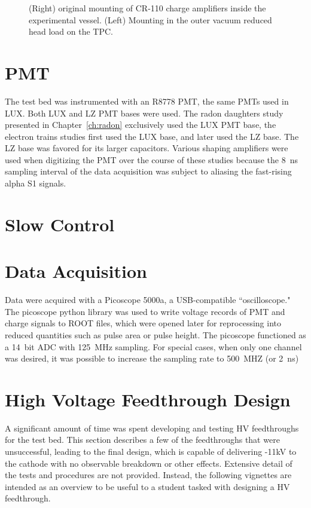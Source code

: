 \begin{figure}[htbp]
\begin{center}
\caption{(Right) original mounting of CR-110 charge amplifiers inside the experimental vessel. (Left) Mounting in the outer vacuum reduced head load on the TPC.}
\label{fig:chargeamp_mount}
\end{center}
\end{figure}



\section{PMT}
The test bed was instrumented with an R8778 PMT, the same PMTs used in LUX. Both LUX and LZ PMT bases were used. The radon daughters study presented in Chapter~\ref{ch:radon} exclusively used the LUX PMT base, the electron trains studies first used the LUX base, and later used the LZ base. The LZ base was favored for its larger capacitors. Various shaping amplifiers were used when digitizing the PMT over the course of these studies because the 8~ns sampling interval of the data acquisition was subject to aliasing the fast-rising alpha S1 signals.


\section{Slow Control}

\section{Data Acquisition}
Data were acquired with a Picoscope 5000a, a USB-compatible ``oscilloscope." The picoscope python library was used to write voltage records of PMT and charge signals to ROOT files, which were opened later for reprocessing into reduced quantities such as pulse area or pulse height. The picoscope functioned as a 14~bit ADC with 125~MHz sampling. For special cases, when only one channel was desired, it was possible to increase the sampling rate to 500~MHZ (or 2~ns)



\section{High Voltage Feedthrough Design}
A significant amount of time was spent developing and testing \ac{HV} feedthroughs for the test bed. This section describes a few of the feedthroughs that were unsuccessful, leading to the final design, which is capable of delivering -11kV to the cathode with no observable breakdown or other effects. Extensive detail of the tests and procedures are not provided. Instead, the following vignettes are intended as an overview to be useful to a student tasked with designing a HV feedthrough. 

